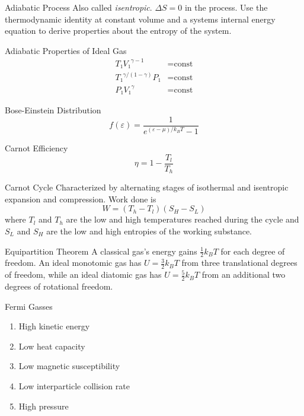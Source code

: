 \documentclass[avery5371,grid]{flashcards}
\begin{document}

\begin{flashcard}{Adiabatic Process}
	Also called \emph{isentropic}. $ΔS = 0$ in the process. Use the
	thermodynamic identity at constant volume and a systems internal energy
	equation to derive properties about the entropy of the system.
\end{flashcard}

\begin{flashcard}{Adiabatic Properties of Ideal Gas}
	\begin{align*}
		T₁ {V₁}^{γ-1} &= \text{const} \\
		{T₁}^{γ/(1-γ)} P₁ &= \text{const} \\
		P₁ {V₁}^γ &= \text{const}
	\end{align*}
\end{flashcard}

\begin{flashcard}{Bose-Einstein Distribution}
	\[ f(ε) = \frac{1}{e^{(ε-μ)/k_B T} - 1} \]
\end{flashcard}

\begin{flashcard}{Carnot Efficiency}
	\[ η = 1 - \frac{T_l}{T_h} \]
\end{flashcard}

\begin{flashcard}{Carnot Cycle}
	Characterized by alternating stages of isothermal and isentropic expansion
	and compression. Work done is
	\[ W = (T_h - T_l)(S_H - S_L) \]
	where $T_l$ and $T_h$ are the low and high temperatures reached during the
	cycle and $S_L$ and $S_H$ are the low and high entropies of the working
	substance.
\end{flashcard}

\begin{flashcard}{Equipartition Theorem}
	A classical gas's energy gains $\frac 12 k_B T$ for each degree of
	freedom. An ideal monotomic gas has
		$ U = \frac 32 k_B T $
	from three translational degrees of freedom, while an ideal diatomic gas
	has
		$ U = \frac 52 k_B T $
	from an additional two degrees of rotational freedom.
\end{flashcard}

\begin{flashcard}{Fermi Gasses}
	\begin{enumerate}
		\item High kinetic energy
		\item Low heat capacity
		\item Low magnetic susceptibility
		\item Low interparticle collision rate
		\item High pressure
	\end{enumerate}
\end{flashcard}
\end{document}
